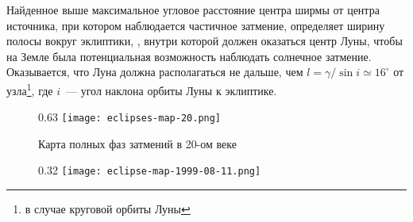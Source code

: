 Найденное выше максимальное угловое расстояние центра ширмы от центра источника, при котором наблюдается частичное затмение, определяет ширину полосы вокруг эклиптики, , внутри которой должен оказаться центр Луны, чтобы на Земле была потенциальная возможность наблюдать солнечное затмение. Оказывается, что Луна должна располагаться не дальше, чем $l = \gamma / \sin i \simeq 16^\circ$ от узла\footnote{в случае круговой орбиты Луны}, где $i$~--- угол наклона орбиты Луны к эклиптике. 

\begin{figure}[h!]
    \begin{subcaptionblock}[t]{0.63\tw}
        \texttt{[image: eclipses-map-20.png]}
        \caption{Карта полных фаз затмений в 20-ом веке}
        \label{pic:eclipse-20-century}
    \end{subcaptionblock}
    \hfill
    \begin{subcaptionblock}[t]{0.32\tw}
        \texttt{[image: eclipse-map-1999-08-11.png]}
        \caption{Карта затмения 11 августа 1999 года%
        }
        \label{pic:eclipse-1999-08-11}
    \end{subcaptionblock}
    \caption{}
\end{figure}

